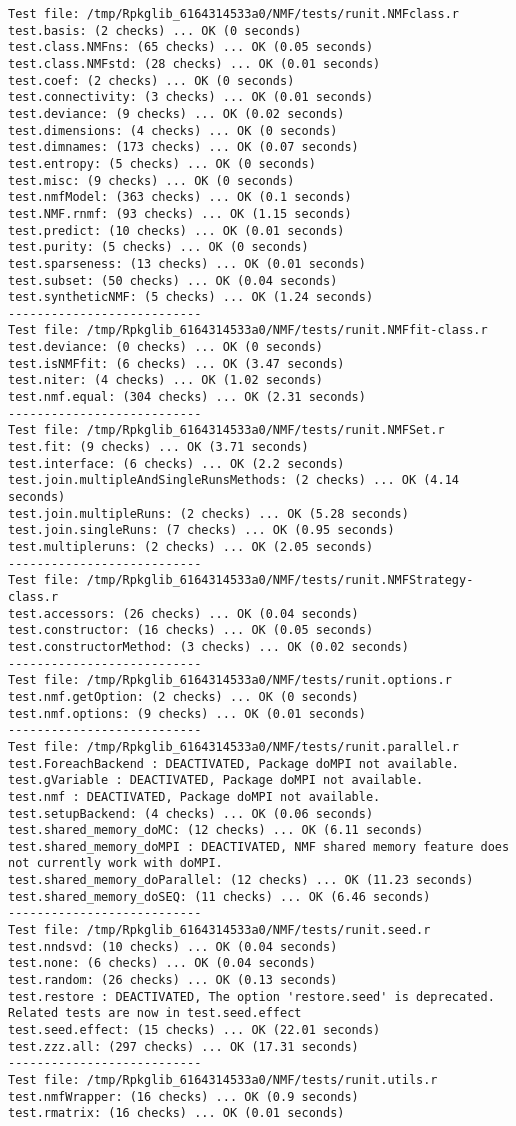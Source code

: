 \documentclass[10pt]{article}\usepackage[]{graphicx}\usepackage[]{color}
\begin{document}
\begin{verbatim}
Test file: /tmp/Rpkglib_6164314533a0/NMF/tests/runit.NMFclass.r 
test.basis: (2 checks) ... OK (0 seconds)
test.class.NMFns: (65 checks) ... OK (0.05 seconds)
test.class.NMFstd: (28 checks) ... OK (0.01 seconds)
test.coef: (2 checks) ... OK (0 seconds)
test.connectivity: (3 checks) ... OK (0.01 seconds)
test.deviance: (9 checks) ... OK (0.02 seconds)
test.dimensions: (4 checks) ... OK (0 seconds)
test.dimnames: (173 checks) ... OK (0.07 seconds)
test.entropy: (5 checks) ... OK (0 seconds)
test.misc: (9 checks) ... OK (0 seconds)
test.nmfModel: (363 checks) ... OK (0.1 seconds)
test.NMF.rnmf: (93 checks) ... OK (1.15 seconds)
test.predict: (10 checks) ... OK (0.01 seconds)
test.purity: (5 checks) ... OK (0 seconds)
test.sparseness: (13 checks) ... OK (0.01 seconds)
test.subset: (50 checks) ... OK (0.04 seconds)
test.syntheticNMF: (5 checks) ... OK (1.24 seconds)
--------------------------- 
Test file: /tmp/Rpkglib_6164314533a0/NMF/tests/runit.NMFfit-class.r 
test.deviance: (0 checks) ... OK (0 seconds)
test.isNMFfit: (6 checks) ... OK (3.47 seconds)
test.niter: (4 checks) ... OK (1.02 seconds)
test.nmf.equal: (304 checks) ... OK (2.31 seconds)
--------------------------- 
Test file: /tmp/Rpkglib_6164314533a0/NMF/tests/runit.NMFSet.r 
test.fit: (9 checks) ... OK (3.71 seconds)
test.interface: (6 checks) ... OK (2.2 seconds)
test.join.multipleAndSingleRunsMethods: (2 checks) ... OK (4.14 seconds)
test.join.multipleRuns: (2 checks) ... OK (5.28 seconds)
test.join.singleRuns: (7 checks) ... OK (0.95 seconds)
test.multipleruns: (2 checks) ... OK (2.05 seconds)
--------------------------- 
Test file: /tmp/Rpkglib_6164314533a0/NMF/tests/runit.NMFStrategy-class.r 
test.accessors: (26 checks) ... OK (0.04 seconds)
test.constructor: (16 checks) ... OK (0.05 seconds)
test.constructorMethod: (3 checks) ... OK (0.02 seconds)
--------------------------- 
Test file: /tmp/Rpkglib_6164314533a0/NMF/tests/runit.options.r 
test.nmf.getOption: (2 checks) ... OK (0 seconds)
test.nmf.options: (9 checks) ... OK (0.01 seconds)
--------------------------- 
Test file: /tmp/Rpkglib_6164314533a0/NMF/tests/runit.parallel.r 
test.ForeachBackend : DEACTIVATED, Package doMPI not available.
test.gVariable : DEACTIVATED, Package doMPI not available.
test.nmf : DEACTIVATED, Package doMPI not available.
test.setupBackend: (4 checks) ... OK (0.06 seconds)
test.shared_memory_doMC: (12 checks) ... OK (6.11 seconds)
test.shared_memory_doMPI : DEACTIVATED, NMF shared memory feature does not currently work with doMPI.
test.shared_memory_doParallel: (12 checks) ... OK (11.23 seconds)
test.shared_memory_doSEQ: (11 checks) ... OK (6.46 seconds)
--------------------------- 
Test file: /tmp/Rpkglib_6164314533a0/NMF/tests/runit.seed.r 
test.nndsvd: (10 checks) ... OK (0.04 seconds)
test.none: (6 checks) ... OK (0.04 seconds)
test.random: (26 checks) ... OK (0.13 seconds)
test.restore : DEACTIVATED, The option 'restore.seed' is deprecated. Related tests are now in test.seed.effect
test.seed.effect: (15 checks) ... OK (22.01 seconds)
test.zzz.all: (297 checks) ... OK (17.31 seconds)
--------------------------- 
Test file: /tmp/Rpkglib_6164314533a0/NMF/tests/runit.utils.r 
test.nmfWrapper: (16 checks) ... OK (0.9 seconds)
test.rmatrix: (16 checks) ... OK (0.01 seconds)


\end{verbatim}
\end{document}

